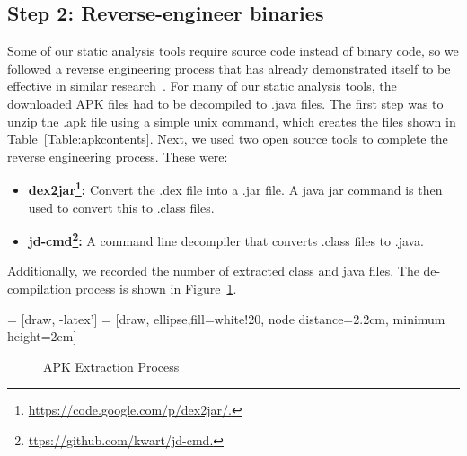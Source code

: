 \subsection{Step 2: Reverse-engineer binaries}
\label{sec: decompliation}
Some of our static analysis tools require source code instead of binary code, so we followed a reverse engineering process that has already demonstrated itself to be effective in similar research~\cite{Lee_2013,6687155}. For many of our static analysis tools, the downloaded APK files had to be decompiled to .java files. The first step was to unzip the .apk file using a simple unix command, which creates the files shown in Table~\ref{Table:apkcontents}. Next, we used two open source tools to complete the reverse engineering process. These were:

\begin{itemize}
  \item \textbf{dex2jar\footnote{\url{https://code.google.com/p/dex2jar/.}}:} Convert the .dex file into a .jar file. A java jar command is then used to convert this to .class files.
  \item \textbf{jd-cmd\footnote{\url{ttps://github.com/kwart/jd-cmd.}}:} A command line decompiler that converts .class files to .java.
\end{itemize}

Additionally, we recorded the number of extracted class and java files. The de-compilation process is shown in Figure~\ref{fig:extractionprocess}.




 = [draw, -latex']
 = [draw, ellipse,fill=white!20, node distance=2.2cm,
    minimum height=2em]

	\begin{figure}[h]
	\begin{center}

\caption{APK Extraction Process}
\label{fig:extractionprocess}
\end{center}
\end{figure}

